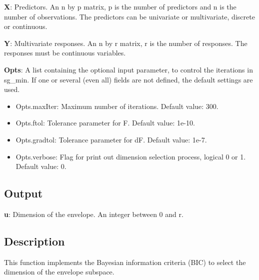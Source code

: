 \documentclass[a4paper,11pt,openany]{memoir}
\begin{document}
\begin{par}
\textbf{X}: Predictors. An n by p matrix, p is the number of predictors and n is the number of observations. The predictors can be univariate or multivariate, discrete or continuous.
\end{par} \vspace{1em}
\begin{par}
\textbf{Y}: Multivariate responses. An n by r matrix, r is the number of responses. The responses must be continuous variables.
\end{par} \vspace{1em}
\begin{par}
\textbf{Opts}: A list containing the optional input parameter, to control the iterations in sg\_min. If one or several (even all) fields are not defined, the default settings are used.
\end{par} \vspace{1em}
\begin{itemize}
\setlength{\itemsep}{-1ex}
   \item Opts.maxIter: Maximum number of iterations.  Default value: 300.
   \item Opts.ftol: Tolerance parameter for F.  Default value: 1e-10.
   \item Opts.gradtol: Tolerance parameter for dF.  Default value: 1e-7.
   \item Opts.verbose: Flag for print out dimension selection process, logical 0 or 1. Default value: 0.
\end{itemize}


\subsection*{Output}

\begin{par}
\textbf{u}: Dimension of the envelope. An integer between 0 and r.
\end{par} \vspace{1em}


\subsection*{Description}

\begin{par}
This function implements the Bayesian information criteria (BIC) to select the dimension of the envelope subspace.
\end{par} \vspace{1em}
\end{document}
